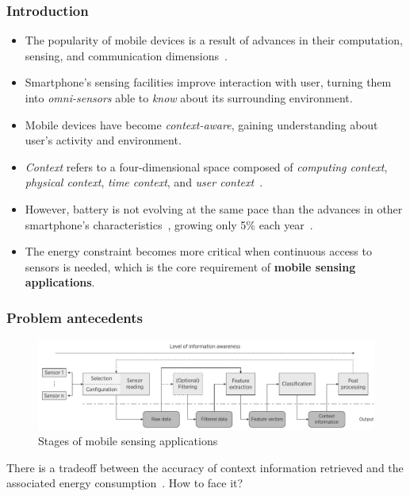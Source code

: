 \documentclass[compress,9pt,xcolor={dvipsnames,table}]{beamer}
\begin{document}
\begin{frame}[t]\frametitle{Introduction}
\begin{itemize}
  \item The popularity of mobile devices is a result of advances in their computation, sensing, and communication dimensions~\cite{Islam2014}.
  \item Smartphone's sensing facilities improve interaction with user, turning them into \emph{omni-sensors} able to \emph{know} about its surrounding environment.
  \item Mobile devices have become \emph{context-aware}, gaining understanding about user's activity and environment.
  \item \emph{Context} refers to a four-dimensional space composed of \emph{computing context}, \emph{physical context}, \emph{time context}, and \emph{user context}~\cite{Chen2000}.
  \item However, battery is not evolving at the same pace than the advances in other smartphone's characteristics~\cite{Kjaergaard2012}, growing only 5\% each year~\cite{Ma2012}.
  \item The energy constraint becomes more critical when continuous access to sensors is needed, which is the core requirement of \textbf{mobile sensing applications}.
\end{itemize}
\end{frame}

\begin{frame}[t]\frametitle{Problem antecedents}
\begin{figure}[tb]
  \centering
  \includegraphics[width=\textwidth]{../../../resources/images/vectors/msa-stages}
  \caption{Stages of mobile sensing applications}
  \label{fig:msa-stages}
\end{figure}
There is a tradeoff between the accuracy of context information retrieved and the associated energy consumption~\cite{Sim2014,Rachuri2012}.
How to face it?
\end{frame}
\end{document}
